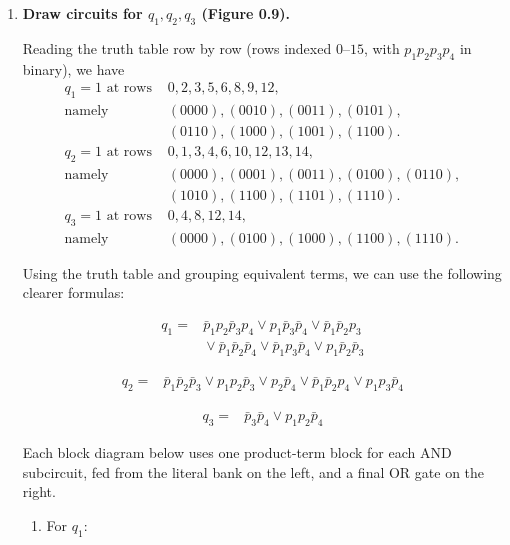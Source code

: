 \begin{enumerate}[{0.}1. ]
\item \textbf{Draw circuits for $q_1, q_2, q_3$ (Figure 0.9).}

Reading the truth table row by row (rows indexed $0$--$15$, with $p_1p_2p_3p_4$
in binary), we have
\[
\begin{aligned}
q_1=1 \text{ at rows }&0,2,3,5,6,8,9,12,\\
\text{namely }&(0000),(0010),(0011),(0101),\\
&(0110),(1000),(1001),(1100).\\[4pt]
q_2=1 \text{ at rows }&0,1,3,4,6,10,12,13,14,\\
\text{namely }&(0000),(0001),(0011),(0100),(0110),\\
&(1010),(1100),(1101),(1110).\\[4pt]
q_3=1 \text{ at rows }&0,4,8,12,14,\\
\text{namely }&(0000),(0100),(1000),(1100),(1110).
\end{aligned}
\]

Using the truth table and grouping equivalent terms, we can use the following
clearer formulas:

\[
\begin{aligned}
q_1 ={}&
\bar p_1 p_2 \bar p_3 p_4
\vee p_1 \bar p_3 \bar p_4
\vee \bar p_1 \bar p_2 p_3\\
&{}\vee \bar p_1 \bar p_2 \bar p_4
\vee \bar p_1 p_3 \bar p_4
\vee p_1 \bar p_2 \bar p_3
\end{aligned}
\]

\[
\begin{aligned}
q_2 ={}&
\bar p_1 \bar p_2 \bar p_3
\vee p_1 p_2 \bar p_3
\vee p_2 \bar p_4
\vee \bar p_1 \bar p_2 p_4
\vee p_1 p_3 \bar p_4
\end{aligned}
\]

\[
\begin{aligned}
q_3 ={}&
\bar p_3 \bar p_4
\vee p_1 p_2 \bar p_4
\end{aligned}
\]

Each block diagram below uses one product-term block for each AND subcircuit,
fed from the literal bank on the left, and a final OR gate on the right.

\begin{enumerate}
\item For $q_1$:


\end{enumerate}
\end{enumerate}
